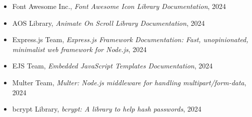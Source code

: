 \documentclass[12pt,a4paper]{report}
\begin{document}
\begin{itemize}
    \item Font Awesome Inc., \textit{Font Awesome Icon Library Documentation}, 2024
    \item AOS Library, \textit{Animate On Scroll Library Documentation}, 2024
    \item Express.js Team, \textit{Express.js Framework Documentation: Fast, unopinionated, minimalist web framework for Node.js}, 2024
    \item EJS Team, \textit{Embedded JavaScript Templates Documentation}, 2024
    \item Multer Team, \textit{Multer: Node.js middleware for handling multipart/form-data}, 2024
    \item bcrypt Library, \textit{bcrypt: A library to help hash passwords}, 2024
\end{itemize}
\end{document}
